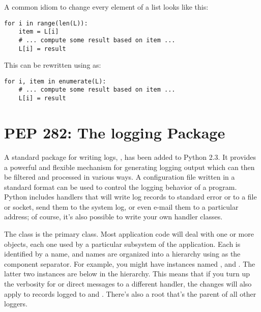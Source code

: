 \documentclass{howto}
\begin{document}
A common idiom to change every element of a list looks like this:

\begin{verbatim}
for i in range(len(L)):
    item = L[i]
    # ... compute some result based on item ...
    L[i] = result
\end{verbatim}

This can be rewritten using  as:

\begin{verbatim}
for i, item in enumerate(L):
    # ... compute some result based on item ...
    L[i] = result
\end{verbatim}


\begin{seealso}


\end{seealso}


\section{PEP 282: The logging Package}

A standard package for writing logs, , has been added
to Python 2.3.  It provides a powerful and flexible mechanism for
generating logging output which can then be filtered and processed in
various ways.  A configuration file written in a standard format can
be used to control the logging behavior of a program.  Python
includes handlers that will write log records to
standard error or to a file or socket, send them to the system log, or
even e-mail them to a particular address; of course, it's also
possible to write your own handler classes.

The  class is the primary class.
Most application code will deal with one or more 
objects, each one used by a particular subsystem of the application.
Each  is identified by a name, and names are organized
into a hierarchy using   as the component separator.  For
example, you might have  instances named ,
 and .  The latter two
instances are below  in the hierarchy.  This means that
if you turn up the verbosity for  or direct 
messages to a different handler, the changes will also apply to
records logged to  and .
There's also a root  that's the parent of all other
loggers.
\end{document}
